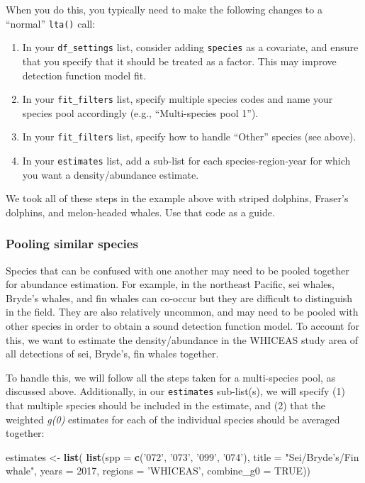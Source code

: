 \documentclass[
]{book}
\newenvironment{Shaded}{\begin{snugshade}}{\end{snugshade}}
\newcommand{\DataTypeTok}[1]{\textcolor[rgb]{0.13,0.29,0.53}{#1}}
\newcommand{\DecValTok}[1]{\textcolor[rgb]{0.00,0.00,0.81}{#1}}
\newcommand{\KeywordTok}[1]{\textcolor[rgb]{0.13,0.29,0.53}{\textbf{#1}}}
\newcommand{\NormalTok}[1]{#1}
\newcommand{\OtherTok}[1]{\textcolor[rgb]{0.56,0.35,0.01}{#1}}
\newcommand{\StringTok}[1]{\textcolor[rgb]{0.31,0.60,0.02}{#1}}
\begin{document}
When you do this, you typically need to make the following changes to a ``normal'' \texttt{lta()} call:

\begin{enumerate}
\def\labelenumi{(\arabic{enumi})}
\item
  In your \texttt{df\_settings} list, consider adding \texttt{species} as a covariate, and ensure that you specify that it should be treated as a factor. This may improve detection function model fit.
\item
  In your \texttt{fit\_filters} list, specify multiple species codes and name your species pool accordingly (e.g., ``Multi-species pool 1'').
\item
  In your \texttt{fit\_filters} list, specify how to handle ``Other'' species (see above).
\item
  In your \texttt{estimates} list, add a sub-list for each species-region-year for which you want a density/abundance estimate.
\end{enumerate}

We took all of these steps in the example above with striped dolphins, Fraser's dolphins, and melon-headed whales. Use that code as a guide.

\hypertarget{pooling-similar-species}{%
\subsubsection*{Pooling similar species}\label{pooling-similar-species}}

Species that can be confused with one another may need to be pooled together for abundance estimation. For example, in the northeast Pacific, sei whales, Bryde's whales, and fin whales can co-occur but they are difficult to distinguish in the field. They are also relatively uncommon, and may need to be pooled with other species in order to obtain a sound detection function model. To account for this, we want to estimate the density/abundance in the WHICEAS study area of all detections of sei, Bryde's, fin whales together.

To handle this, we will follow all the steps taken for a multi-species pool, as discussed above. Additionally, in our \texttt{estimates} sub-list(s), we will specify (1) that multiple species should be included in the estimate, and (2) that the weighted \emph{g(0)} estimates for each of the individual species should be averaged together:

\begin{Shaded}
\begin{Highlighting}[]
\NormalTok{estimates <-}\StringTok{ }\KeywordTok{list}\NormalTok{(}
  \KeywordTok{list}\NormalTok{(}\DataTypeTok{spp =} \KeywordTok{c}\NormalTok{(}\StringTok{'072'}\NormalTok{, }\StringTok{'073'}\NormalTok{, }\StringTok{'099'}\NormalTok{, }\StringTok{'074'}\NormalTok{),}
       \DataTypeTok{title =} \StringTok{"Sei/Bryde's/Fin whale"}\NormalTok{,}
       \DataTypeTok{years =} \DecValTok{2017}\NormalTok{,}
       \DataTypeTok{regions =} \StringTok{'WHICEAS'}\NormalTok{,}
       \DataTypeTok{combine_g0 =} \OtherTok{TRUE}\NormalTok{))}
\end{Highlighting}
\end{Shaded}
\end{document}
